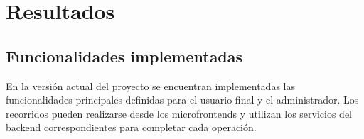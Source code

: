 %

\section{Resultados}
\label{sec:resultados}

\subsection{Funcionalidades implementadas}
\label{sec:funcionalidades}

En la versión actual del proyecto se encuentran implementadas las funcionalidades
principales definidas para el usuario final y el administrador. Los recorridos
pueden realizarse desde los microfrontends y utilizan los servicios del backend
correspondientes para completar cada operación.

